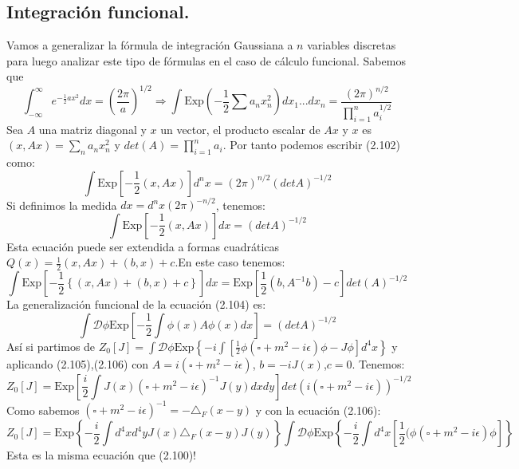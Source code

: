 \subsection{Integración funcional.}
Vamos a generalizar la fórmula de integración Gaussiana a $n$ variables discretas para luego analizar este tipo de fórmulas en el caso de cálculo funcional. Sabemos que 
\begin{equation}
\int_{-\infty}^{\infty}e^{-\frac{1}{2}ax^{2}}dx=\left(\frac{2\pi}{a}\right)^{1/2}\Rightarrow\int\text{Exp}\left(-\frac{1}{2}\sum a_{n}x_{n}^{2}\right)dx_{1}...dx_{n}=\frac{(2\pi)^{n/2}}{\prod_{i=1}^{n}a_{i}^{1/2}}
\end{equation}
Sea $A$ una matriz diagonal y $x$ un vector, el producto escalar de $Ax$ y $x$ es $(x,Ax)=\sum_n a_nx_{n}^{2}$ y $det(A)=\prod_{i=1}^{n}a_i$. Por tanto podemos escribir (2.102) como:
\begin{equation}
\int\text{Exp}\left[-\frac{1}{2}(x,Ax)\right]d^{n}x=(2\pi)^{n/2}(detA)^{-1/2}
\end{equation}
Si definimos la medida $dx=d^nx(2\pi)^{-n/2}$, tenemos:
\begin{equation}
\int\text{Exp}\left[-\frac{1}{2}(x,Ax)\right]dx=(detA)^{-1/2}
\end{equation}
Esta ecuación puede ser extendida a formas cuadráticas $Q(x)=\frac{1}{2}(x,Ax)+(b,x)+c$.En este caso tenemos:
\begin{equation}
\int\text{Exp}\left[-\frac{1}{2}\left\{ (x,Ax)+(b,x)+c\right\} \right]dx=\text{Exp}\left[\frac{1}{2}(b,A^{-1}b)-c\right]det(A)^{-1/2}
\end{equation}
La generalización funcional de la ecuación (2.104) es:
\begin{equation}
\int\mathcal{D}\phi\text{Exp}\left[-\frac{1}{2}\int\phi(x)A\phi(x)dx\right]=(detA)^{-1/2}
\end{equation}
Así si partimos de $Z_{0}[J]=\int\mathcal{D}\phi\text{Exp}\left\{ -i\int\left[\frac{1}{2}\phi(\square+m^{2}-i\epsilon)\phi-J\phi\right]d^{4}x\right\} $ y aplicando (2.105),(2.106) con $A=i(\square+m^2-i\epsilon)$, $b=-iJ(x)$,$c=0$. Tenemos:
\begin{equation}
Z_{0}[J]=\text{Exp}\left[\frac{i}{2}\int J(x)(\square+m^{2}-i\epsilon)^{-1}J(y)dxdy\right]det(i(\square+m^{2}-i\epsilon))^{-1/2}
\end{equation}
Como sabemos $(\square +m^2-i\epsilon)^{-1}=-\triangle_F(x-y)$ y con la ecuación (2.106):
\begin{equation}
Z_0[J]=\text{Exp}\left\{ -\frac{i}{2}\int d^{4}xd^{4}yJ(x)\triangle_{F}(x-y)J(y)\right\} \int\mathcal{D}\phi\text{Exp}\left\{ -\frac{i}{2}\int d^{4}x\left[\frac{1}{2}(\phi(\square +m^{2}-i\epsilon)\phi\right]\right\} 
\end{equation}
Esta es la misma ecuación que (2.100)!

